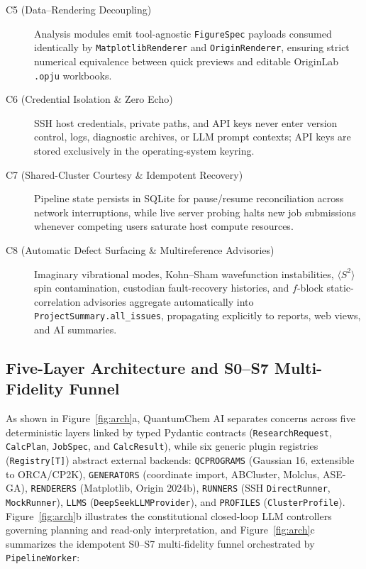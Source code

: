 \documentclass[journal=jctcce,manuscript=article]{achemso}
\begin{document}
\begin{description}
  \item[C5 (Data--Rendering Decoupling)] Analysis modules emit tool-agnostic \texttt{FigureSpec} payloads consumed identically by \texttt{MatplotlibRenderer} and \texttt{OriginRenderer}, ensuring strict numerical equivalence between quick previews and editable OriginLab \texttt{.opju} workbooks.
  \item[C6 (Credential Isolation \& Zero Echo)] SSH host credentials, private paths, and API keys never enter version control, logs, diagnostic archives, or LLM prompt contexts; API keys are stored exclusively in the operating-system keyring.
  \item[C7 (Shared-Cluster Courtesy \& Idempotent Recovery)] Pipeline state persists in SQLite for pause/resume reconciliation across network interruptions, while live server probing halts new job submissions whenever competing users saturate host compute resources.
  \item[C8 (Automatic Defect Surfacing \& Multireference Advisories)] Imaginary vibrational modes, Kohn--Sham wavefunction instabilities, $\langle S^2 \rangle$ spin contamination, custodian fault-recovery histories, and $f$-block static-correlation advisories aggregate automatically into \texttt{ProjectSummary.all\_issues}, propagating explicitly to reports, web views, and AI summaries.
\end{description}

\subsection{Five-Layer Architecture and S0--S7 Multi-Fidelity Funnel}

As shown in Figure~\ref{fig:arch}a, QuantumChem AI separates concerns across five deterministic layers linked by typed Pydantic contracts (\texttt{ResearchRequest}, \texttt{CalcPlan}, \texttt{JobSpec}, and \texttt{CalcResult}), while six generic plugin registries (\texttt{Registry[T]}) abstract external backends: \texttt{QCPROGRAMS} (Gaussian 16,\cite{frisch2019g16} extensible to ORCA/CP2K), \texttt{GENERATORS} (coordinate import, ABCluster, Molclus, ASE-GA), \texttt{RENDERERS} (Matplotlib, Origin 2024b), \texttt{RUNNERS} (SSH \texttt{DirectRunner}, \texttt{MockRunner}), \texttt{LLMS} (\texttt{DeepSeekLLMProvider}), and \texttt{PROFILES} (\texttt{ClusterProfile}). Figure~\ref{fig:arch}b illustrates the constitutional closed-loop LLM controllers governing planning and read-only interpretation, and Figure~\ref{fig:arch}c summarizes the idempotent S0--S7 multi-fidelity funnel orchestrated by \texttt{PipelineWorker}:
\end{document}
